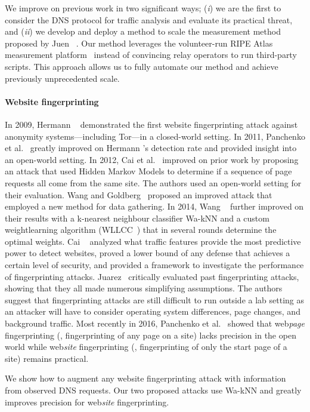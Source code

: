 We improve on previous work in two significant ways; (\emph{i}) we are the first
to consider the DNS protocol for traffic analysis and evaluate its practical
threat, and (\emph{ii}) we develop and deploy a method to scale the measurement
method proposed by Juen \ea~\cite{Juen2015a}.  Our method leverages the
volunteer-run RIPE Atlas measurement platform~\cite{atlas} instead of convincing
relay operators to run third-party scripts.  This approach allows us to fully
automate our method and achieve previously unprecedented scale.

\paragraph{Website fingerprinting}
In 2009, Hermann \ea~\cite{Hermann2009a} demonstrated the first website
fingerprinting attack against anonymity systems---including Tor---in a
closed-world setting.  In 2011, Panchenko et al.~\cite{Panchenko2011a} greatly
improved on Hermann \ea's detection rate and provided insight into an open-world
setting.  In 2012, Cai et al.~\cite{Cai2012a} improved on prior work by
proposing an attack that used Hidden Markov Models to determine if a sequence of
page requests all come from the same site.  The authors used an open-world
setting for their evaluation.  Wang and Goldberg~\cite{Wang2013a} proposed an
improved attack that employed a new method for data gathering.  In 2014, Wang
\ea~\cite{Wang2014a} further improved on their results with a
k-nearest neighbour classifier Wa-kNN and a custom weightlearning algorithm
(WLLCC~\cite{WangThesis}) that in several rounds determine the optimal weights.
Cai \ea~\cite{Cai2014b}
analyzed what traffic features provide the most predictive power to detect
websites, proved a lower bound of any defense that achieves a certain level of
security, and provided a framework to investigate the performance of
fingerprinting attacks.  Juarez~\cite{Juarez2014a} critically evaluated past
fingerprinting attacks, showing that they all made numerous simplifying
assumptions.  The authors suggest that fingerprinting attacks are still
difficult to run outside a lab setting as an attacker will have to consider
operating system differences, page changes, and background traffic.  Most
recently in 2016, Panchenko et al.~\cite{Panchenko2016a} showed that
web\emph{page} fingerprinting (\ie, fingerprinting of any page on a site) lacks
precision in the open world while web\emph{site} fingerprinting (\ie,
fingerprinting of only the start page of a site) remains practical.

We show how to augment any website fingerprinting attack with information from
observed DNS requests. Our two proposed attacks use Wa-kNN and greatly improves
precision for web\emph{site} fingerprinting. 
